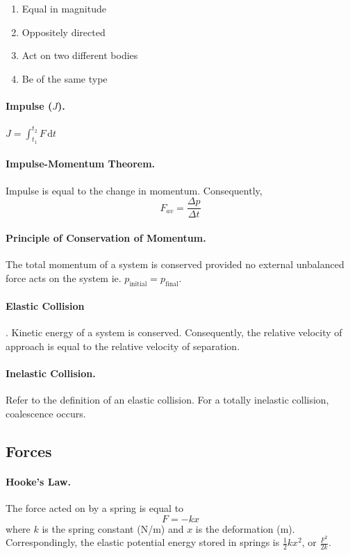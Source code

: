 \documentclass{article}
\begin{document}
\begin{enumerate}
\item Equal in magnitude
\item Oppositely directed
\item Act on two different bodies
\item Be of the same type
\end{enumerate}

\paragraph{Impulse ($J$).} $J = \int^{t_2}_{t_1} \! F \, \mathrm{d}{t}$

\paragraph{Impulse-Momentum Theorem.} Impulse is equal to the change in momentum. Consequently, \begin{equation}
F_{av} = \frac{\Delta p}{\Delta t}
\end{equation}

\paragraph{Principle of Conservation of Momentum.} The total momentum of a system is conserved provided no external unbalanced force acts on the system ie. $p_\text{initial} = p_\text{final}$.

\paragraph{Elastic Collision}. Kinetic energy of a system is conserved.  Consequently, the relative velocity of approach is equal to the relative velocity of separation.

\paragraph{Inelastic Collision.} Refer to the definition of an elastic collision. For a totally inelastic collision, coalescence occurs.

\subsection{Forces}

\paragraph{Hooke's Law.} The force acted on by a spring is equal to \begin{equation}
F = -kx
\end{equation} where $k$ is the spring constant (N/m) and $x$ is the deformation (m). Correspondingly, the elastic potential energy stored in springs is $\frac{1}{2}kx^2$, or $\frac{F^2}{2k}$.
\end{document}
